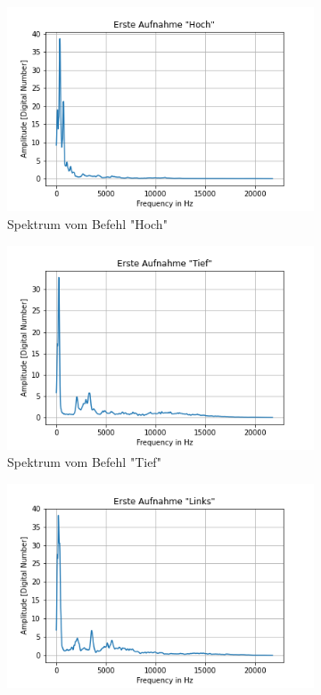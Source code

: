 \documentclass[12pt, oneside, a4paper, \docLanguage]{report}
\begin{document}
\begin{figure}[H]
\centering
	\begin{subfigure}{.5\textwidth}
  		\centering
 		 \includegraphics[width=.95\linewidth]{media/ersteAufnahmeHoch.png}
  		\caption{Spektrum vom Befehl "Hoch"}
 		 \label{fig:VERSUCH_2_sub1}
	\end{subfigure}%
	\begin{subfigure}{.5\textwidth}
  		\centering
 		 \includegraphics[width=.95\linewidth]{media/ersteAufnahmeTief.png}
  		\caption{Spektrum vom Befehl "Tief"}
  		\label{fig:VERSUCH_2_sub2}
	\end{subfigure}
	\begin{subfigure}{.5\textwidth}
  		\centering
 		 \includegraphics[width=.95\linewidth]{media/ersteAufnahmeLinks.png}

\end{subfigure}
\end{figure}
\end{document}
